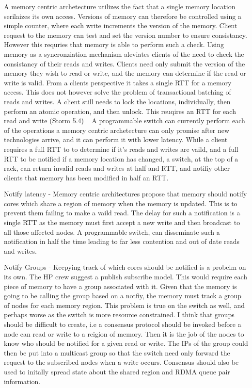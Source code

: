 A memory centric archetecture utilizes the fact that a single memory location
serilaizes its own access. Versions of memory can therefore be controlled
using a simple counter, where each write increments the version of the
memory. Client request to the memory can test and set the version number to
ensure consistancy. However this requries that memory is able to perform such
a check. Using memory as a syncronziation mechanism aleviates clients of the
need to check the consistancy of their reads and writes. Clients need only
submit the version of the memory they wish to read or write, and the memory
can determine if the read or write is valid. From a clients perspective it
takes a single RTT for a memory access. This does not however solve the
problem of transactional batching of reads and writes. A client still needs
to lock the locations, individually, then perform an atomic operation, and
then unlock. This reuqires an RTT for each read and write (Storm 5.4)
~\cite{storm} A programmable switch can currently perform each of the
operations a memory centric archetecture can only promise after new
technologies arrive, and it can perform it with lower latency. While a client
requires a full RTT to to determine if it's reads and writes are vaild, and a
full RTT to be notified if a memory location has changed, a switch, at the
top of a rack, can return invalid reads and writes at half and RTT, and
notifiy other clients that memory has been modified in half an RTT.

Notify latency - Memory centric architectures propose that memory should
notify cores which share a region of memory when the memory is updated. This
is to prevent them failing to make a vaild read. The delay for such a
notification is a single RTT as the memory must first accept a new write and
then broadcast to all those affected nodes. A programmable switch, can
disseminate such a notification in half the time leading to far less
contention and out of date reads and writes.

Notify Groups - Keepying track of which cores should be notified is a probelm
on its own. The HP crew suggest a publish subscribe model. This would require
each piece of memory to have a group associated with it. Given that the
memory is going to be calling the group based on a notfiy, the memory must
track a group of nodes for each memory region. This problem is true on the
switch as well, and perhaps worse as the switch is more resource constrained.
I think that groups should be difficult to create, i.e a consensus protocol
should be invoked before a node can read or write to a reigion of memory.
Then it is the job of the nodes to know who should be notified for a given
read or write. The IPs of the group could then be put into a multicast group
so that the switch need only forward the request to the subscribed nodes when
a write occurs. Consensus should also be used to initally spread state about
the shared region and RDMA queue pair information.

